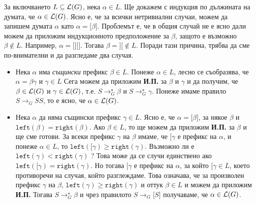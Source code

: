 \begin{hint}
  За включването $L \subseteq \mathcal{L}(G)$, нека $\alpha \in L$.
  Ще докажем с индукция по дължината на думата, че $\alpha \in \mathcal{L}(G)$.
  Ясно е, че за всички нетривиални случаи, можем да запишем думата $\alpha$ като $\alpha = \texttt{[}\beta\texttt{]}$.
  Проблемът е, че в общия случай не е ясно дали можем да приложим индукционното предположение за $\beta$,
  защото е възможно $\beta \not\in L$. Например, $\alpha = \texttt{[][]}$.
  Тогава $\beta = \texttt{][} \not \in L$.
  Поради тази причина, трябва да сме по-внимателни и да разгледаме два случая.
  \begin{itemize}
  \item 
    Нека $\alpha$ има {\em същински} префикс $\beta \in L$.
    Понеже $\alpha \in L$, лесно се съобразява, че $\alpha = \beta\gamma$ и $\gamma \in L$
    Сега можем да приложим {\bf И.П.} за $\beta$ и $\gamma$ и да получим, че 
    $\beta \in \mathcal{L}(G)$ и $\gamma \in \mathcal{L}(G)$, т.е.
    $S \to^\star_G \beta$ и $S \to^\star_G \gamma$.
    Понеже имаме правило $S \to_G SS$, то е ясно, че $\alpha \in \mathcal{L}(G)$.
  \item
    Нека $\alpha$ да няма същински префикс $\gamma \in L$.
    Ясно е, че $\alpha = \texttt{[}\beta\texttt{]}$, за някое $\beta$
    и $\texttt{left}(\beta) = \texttt{right}(\beta)$. 
    Ако $\beta \in L$, то ще можем да приложим {\bf И.П.} за $\beta$ и ще сме готови.
    За всеки префикс $\gamma$ на $\beta$ имаме, че $\texttt{[}\gamma$ е префикс на $\alpha$,
    и понеже $\alpha \in L$, то $\texttt{left}(\texttt{[}\gamma) \geq \texttt{right}(\gamma)$.
    Възможно ли е $\texttt{left}(\gamma) < \texttt{right}(\gamma)$ ?
    Това може да се случи единствено ако $\texttt{left}(\texttt{[}\gamma) = \texttt{right}(\gamma)$.
    Но тогава $\texttt{[}\gamma$ е префикс на $\alpha$, за който $\texttt{[}\gamma \in L$,
    което противоречи на случая, който разглеждаме.
    Това означава, че за произволен префикс $\gamma$ на $\beta$,
    $\texttt{left}(\gamma) \geq \texttt{right}(\gamma)$ и оттук $\beta \in L$ и можем да приложим {\bf И.П.}
    Тогава $S \to^\star_G \beta$ и чрез правилото $S \to_G \texttt{[}S\texttt{]}$
    получаваме, че $\alpha \in \mathcal{L}(G)$.    
  \end{itemize}
\end{hint}

